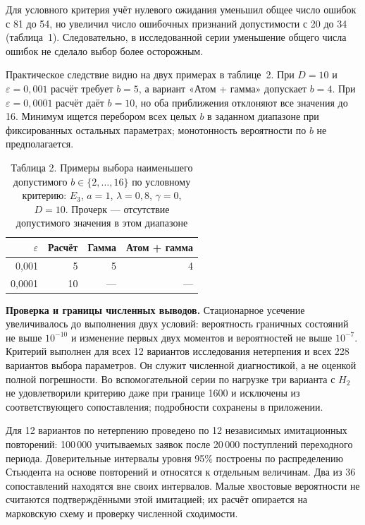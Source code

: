 Для условного критерия учёт нулевого ожидания уменьшил общее число ошибок с 81 до 54, но увеличил число ошибочных признаний допустимости с 20 до 34 (таблица~1). Следовательно, в исследованной серии уменьшение общего числа ошибок не сделало выбор более осторожным.

Практическое следствие видно на двух примерах в таблице~2. При $D=10$ и $\varepsilon=0{,}001$ расчёт требует $b=5$, а вариант «Атом + гамма» допускает $b=4$. При $\varepsilon=0{,}0001$ расчёт даёт $b=10$, но оба приближения отклоняют все значения до 16. Минимум ищется перебором всех целых $b$ в заданном диапазоне при фиксированных остальных параметрах; монотонность вероятности по $b$ не предполагается.

\begin{table}[htbp]\centering\small
\caption{Таблица 2. Примеры выбора наименьшего допустимого $b\in\{2,\ldots,16\}$ по условному критерию: $E_3$, $a=1$, $\lambda=0{,}8$, $\gamma=0$, $D=10$. Прочерк --- отсутствие допустимого значения в этом диапазоне}
\begin{tabular}{rrrr}
\hline
$\varepsilon$ & Расчёт & Гамма & Атом + гамма \\
\hline
0,001 & 5 & 5 & 4 \\
0,0001 & 10 & --- & --- \\
\hline
\end{tabular}

\end{table}

\noindent\textbf{Проверка и границы численных выводов.}
Стационарное усечение увеличивалось до выполнения двух условий: вероятность граничных состояний не выше $10^{-10}$ и изменение первых двух моментов и вероятностей не выше $10^{-7}$. Критерий выполнен для всех 12 вариантов исследования нетерпения и всех 228 вариантов выбора параметров. Он служит численной диагностикой, а не оценкой полной погрешности. Во вспомогательной серии по нагрузке три варианта с $H_2$ не удовлетворили критерию даже при границе 1600 и исключены из соответствующего сопоставления; подробности сохранены в приложении.

Для 12 вариантов по нетерпению проведено по 12 независимых имитационных повторений: 100\,000 учитываемых заявок после 20\,000 поступлений переходного периода. Доверительные интервалы уровня 95\% построены по распределению Стьюдента на основе повторений и относятся к отдельным величинам. Два из 36 сопоставлений находятся вне своих интервалов. Малые хвостовые вероятности не считаются подтверждёнными этой имитацией; их расчёт опирается на марковскую схему и проверку численной сходимости.


